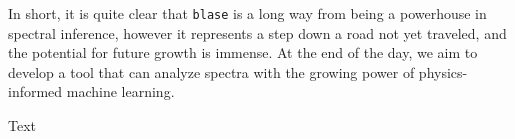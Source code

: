 \documentclass[twocolumn]{aastex631}
\begin{document}
In short, it is quite clear that \texttt{blase} is a long way from being a powerhouse in spectral inference, however it represents a step down a road not yet traveled, and the potential for future growth is immense. 
At the end of the day, we aim to develop a tool that can analyze spectra with the growing power of physics-informed machine learning.

\begin{acknowledgements}
    Text
\end{acknowledgements}



\end{document}
